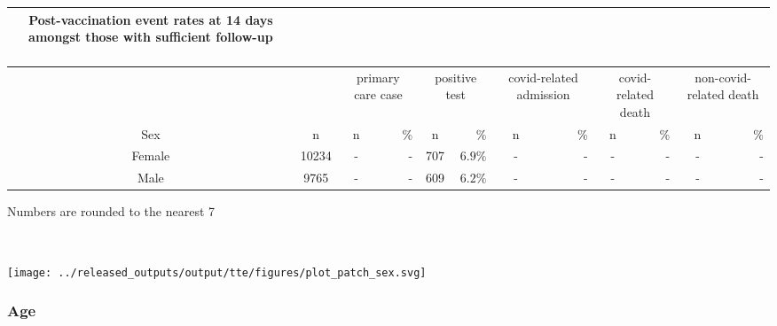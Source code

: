 \documentclass[
]{article}
\begin{document}
\captionsetup[table]{labelformat=empty,skip=1pt}
\begin{longtable}{cccrcrcrcrcr}
\caption*{
\large Post-vaccination event rates at 14 days amongst those with sufficient follow-up\\ 
\small \\ 
} \\ 
\toprule
& & \multicolumn{2}{c}{primary care case} & \multicolumn{2}{c}{positive test} & \multicolumn{2}{c}{covid-related admission} & \multicolumn{2}{c}{covid-related death} & \multicolumn{2}{c}{non-covid-related death} \\ 
 \cmidrule(lr){3-4}\cmidrule(lr){5-6}\cmidrule(lr){7-8}\cmidrule(lr){9-10}\cmidrule(lr){11-12}
Sex & n & n & \% & n & \% & n & \% & n & \% & n & \% \\ 
\midrule
Female & 10234 & - & - & 707 & $6.9\%$ & - & - & - & - & - & - \\ 
Male & 9765 & - & - & 609 & $6.2\%$ & - & - & - & - & - & - \\ 
\bottomrule
\end{longtable}
\begin{minipage}{\linewidth}
Numbers are rounded to the nearest 7\\ 
\end{minipage}

~ ~

\texttt{[image: ../released\_outputs/output/tte/figures/plot\_patch\_sex.svg]}

\hypertarget{age}{%
\subsubsection{Age}\label{age}}
\end{document}
